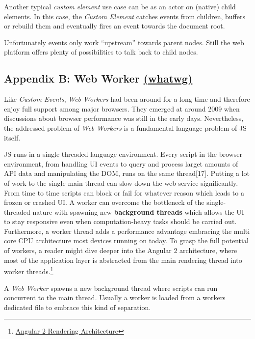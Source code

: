 \documentclass[]{article}
\begin{document}
Another typical \emph{custom element} use case can be as an actor on
(native) child elements. In this case, the \emph{Custom Element} catches
events from children, buffers or rebuild them and eventually fires an
event towards the document root.

Unfortunately events only work ``upstream'' towards parent nodes. Still
the web platform offers plenty of possibilities to talk back to child
nodes.

\subsection{\texorpdfstring{Appendix B: Web Worker
\href{https://html.spec.whatwg.org/multipage/workers.html}{(whatwg)}}{Appendix B: Web Worker (whatwg)}}\label{appendix-b-web-worker-whatwg}

Like \emph{Custom Events}, \emph{Web Workers} had been around for a long
time and therefore enjoy full support among major browsers. They emerged
at around 2009 when discussions about browser performance was still in
the early days. Nevertheless, the addressed problem of \emph{Web
Workers} is a fundamental language problem of JS itself.

JS runs in a single-threaded language environment. Every script in the
browser environment, from handling UI events to query and process larget
amounts of API data and manipulating the DOM, runs on the same
thread{[}17{]}. Putting a lot of work to the single main thread can slow
down the web service significantly. From time to time scripts can block
or fail for whatever reason which leads to a frozen or crashed UI. A
worker can overcome the bottleneck of the single-threaded nature with
spawning new \textbf{background threads} which allows the UI to stay
responsive even when computation-heavy tasks should be carried out.
Furthermore, a worker thread adds a performance advantage embracing the
multi core CPU architecture most devices running on today. To grasp the
full potential of workers, a reader might dive deeper into the Angular 2
architecture, where most of the application layer is abstracted from the
main rendering thread into worker threads.\footnote{\href{https://docs.google.com/document/d/1M9FmT05Q6qpsjgvH1XvCm840yn2eWEg0PMskSQz7k4E}{Angular
  2 Rendering Architecture}}

A \emph{Web Worker} spawns a new background thread where scripts can run
concurrent to the main thread. Usually a worker is loaded from a workers
dedicated file to embrace this kind of separation.
\end{document}
